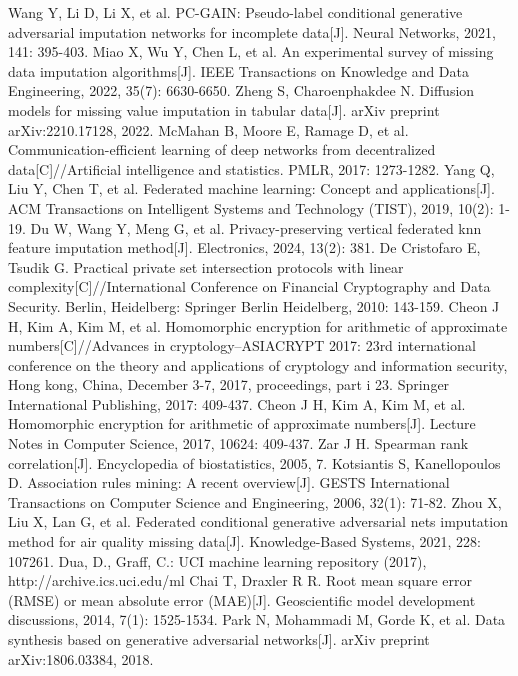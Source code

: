 \documentclass[final,1p,times]{elsarticle}
\begin{document}
\begin{thebibliography}{00}
Wang Y, Li D, Li X, et al. PC-GAIN: Pseudo-label conditional generative adversarial imputation networks for incomplete data[J]. Neural Networks, 2021, 141: 395-403.
Miao X, Wu Y, Chen L, et al. An experimental survey of missing data imputation algorithms[J]. IEEE Transactions on Knowledge and Data Engineering, 2022, 35(7): 6630-6650.
Zheng S, Charoenphakdee N. Diffusion models for missing value imputation in tabular data[J]. arXiv preprint arXiv:2210.17128, 2022.
McMahan B, Moore E, Ramage D, et al. Communication-efficient learning of deep networks from decentralized data[C]//Artificial intelligence and statistics. PMLR, 2017: 1273-1282.
Yang Q, Liu Y, Chen T, et al. Federated machine learning: Concept and applications[J]. ACM Transactions on Intelligent Systems and Technology (TIST), 2019, 10(2): 1-19.
Du W, Wang Y, Meng G, et al. Privacy-preserving vertical federated knn feature imputation method[J]. Electronics, 2024, 13(2): 381.
De Cristofaro E, Tsudik G. Practical private set intersection protocols with linear complexity[C]//International Conference on Financial Cryptography and Data Security. Berlin, Heidelberg: Springer Berlin Heidelberg, 2010: 143-159.
Cheon J H, Kim A, Kim M, et al. Homomorphic encryption for arithmetic of approximate numbers[C]//Advances in cryptology–ASIACRYPT 2017: 23rd international conference on the theory and applications of cryptology and information security, Hong kong, China, December 3-7, 2017, proceedings, part i 23. Springer International Publishing, 2017: 409-437.
Cheon J H, Kim A, Kim M, et al. Homomorphic encryption for arithmetic of approximate numbers[J]. Lecture Notes in Computer Science, 2017, 10624: 409-437.
Zar J H. Spearman rank correlation[J]. Encyclopedia of biostatistics, 2005, 7.
Kotsiantis S, Kanellopoulos D. Association rules mining: A recent overview[J]. GESTS International Transactions on Computer Science and Engineering, 2006, 32(1): 71-82.
Zhou X, Liu X, Lan G, et al. Federated conditional generative adversarial nets imputation method for air quality missing data[J]. Knowledge-Based Systems, 2021, 228: 107261.
Dua, D., Graff, C.: UCI machine learning repository (2017), http://archive.ics.uci.edu/ml
Chai T, Draxler R R. Root mean square error (RMSE) or mean absolute error (MAE)[J]. Geoscientific model development discussions, 2014, 7(1): 1525-1534.
Park N, Mohammadi M, Gorde K, et al. Data synthesis based on generative adversarial networks[J]. arXiv preprint arXiv:1806.03384, 2018.

\end{thebibliography}
\end{document}
